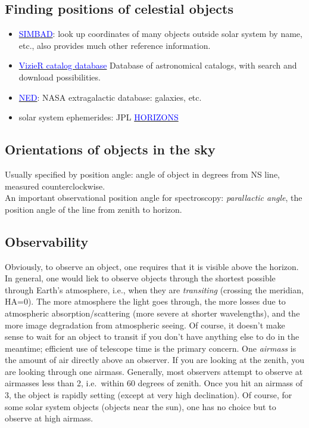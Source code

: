 \documentclass[12pt]{article}
\begin{document}
\subsection*{Finding positions of celestial objects}
\begin{itemize}
    \item \href{http://simbad.u-strasbg.fr/simbad/}
        {\textcolor{blue}{SIMBAD}}:
        look up coordinates of many objects outside solar system
        by name, etc., also provides much other reference information.
    \item \href{http://vizier.u-strasbg.fr/viz-bin/VizieR}
        {\textcolor{blue}{VizieR catalog database}}
        Database of astronomical catalogs, with search and download
        possibilities.
    \item \href{http://ned.ipac.caltech.edu}
        {\textcolor{blue}{NED}}:
        NASA extragalactic database: galaxies, etc.
    \item solar system ephemerides: JPL
        \href{http://ssd.jpl.nasa.gov/horizons.cgi}
        {\textcolor{blue}{HORIZONS}}
\end{itemize}

\subsection*{Orientations of objects in the sky}
Usually specified by position angle: angle of object in degrees from NS line,
measured counterclockwise.\\

\noindent An important observational position angle for spectroscopy:
\emph{parallactic angle}, the position angle of the line from zenith to
horizon.

\subsection*{Observability}
Obviously, to observe an object, one requires that it is visible above the
horizon. In general, one would liek to observe objects through the shortest
possible through Earth's atmosphere, i.e., when they are \emph{transiting}
(crossing the meridian, HA=0). The more atmosphere the light goes through,
the more losses due to atmospheric absorption/scattering (more severe at
shorter wavelengths), and the more image degradation from atmospheric seeing.
Of course, it doesn't make sense to wait for an object to transit if you
don't have anything else to do in the meantime; efficient use of telescope time
is the primary concern.
One \emph{airmass} is the amount of air directly above an observer.
If you are looking at the zenith, you are looking through one airmass.
Generally, most observers attempt to observe at airmasses
less than 2, i.e.\ within 60 degrees of zenith. Once you hit an airmass
of 3, the object is rapidly setting (except at very high declination).
Of course, for some solar system objects (objects near the sun), one has no
choice but to observe at high airmass.\\
\end{document}
